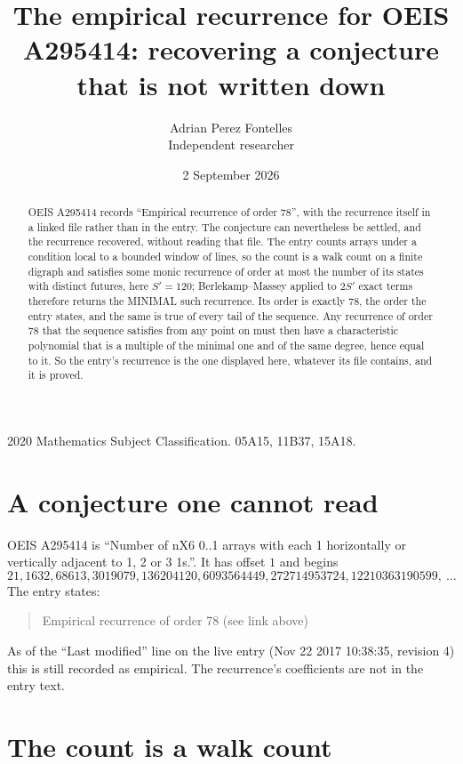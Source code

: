 \documentclass[11pt,a4paper]{article}
\title{The empirical recurrence for OEIS A295414: recovering a conjecture that is not written down}
\author{Adrian Perez Fontelles\\ \small Independent researcher}
\date{2 September 2026}
\theoremstyle{plain}
\theoremstyle{definition}
\begin{document}
\maketitle

\begin{abstract}
OEIS A295414 records ``Empirical recurrence of order $78$'', with the recurrence itself in a
linked file rather than in the entry. The conjecture can nevertheless be settled, and the
recurrence recovered, without reading that file. The entry counts arrays under a condition
local to a bounded window of lines, so the count is a walk count on a finite digraph and
satisfies some monic recurrence of order at most the number of its states with distinct
futures, here $S'=120$; Berlekamp--Massey applied to $2S'$ exact
terms therefore returns the MINIMAL such recurrence. Its order is exactly $78$, the order
the entry states, and the same is true of every tail of the sequence. Any recurrence of order
$78$ that the sequence satisfies from any point on must then have a characteristic
polynomial that is a multiple of the minimal one and of the same degree, hence equal to it. So
the entry's recurrence is the one displayed here, whatever its file contains, and it is
proved.
\end{abstract}

\noindent\small 2020 Mathematics Subject Classification. 05A15, 11B37, 15A18.\normalsize

\section{A conjecture one cannot read}

OEIS A295414 is ``Number of nX6 0..1 arrays with each 1 horizontally or vertically adjacent to 1, 2 or 3 1s.''. It has offset $1$ and begins
\[
21, 1632, 68613, 3019079, 136204120, 6093564449, 272714953724, 12210363190599,\ \dots
\]
The entry states:
\begin{quote}
Empirical recurrence of order 78 (see link above)
\end{quote}
As of the ``Last modified'' line on the live entry (Nov 22 2017 10:38:35, revision 4) this is still
recorded as empirical. The recurrence's coefficients are not in the entry text.

\section{The count is a walk count}
\end{document}
